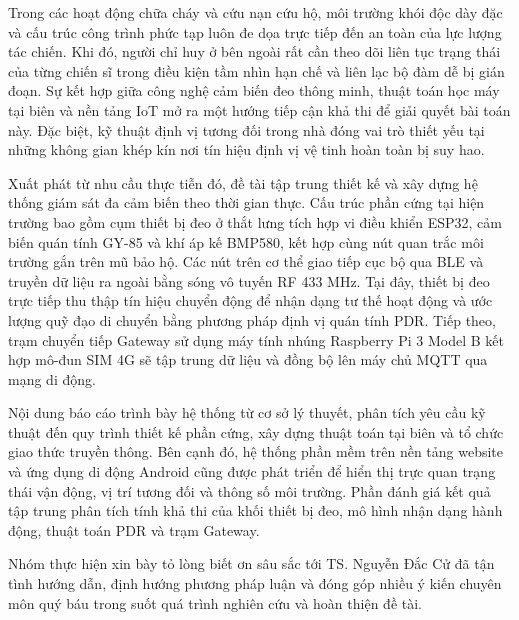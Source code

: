 Trong các hoạt động chữa cháy và cứu nạn cứu hộ, môi trường khói độc dày đặc và cấu trúc công trình phức tạp luôn đe dọa trực tiếp đến an toàn của lực lượng tác chiến. Khi đó, người chỉ huy ở bên ngoài rất cần theo dõi liên tục trạng thái của từng chiến sĩ trong điều kiện tầm nhìn hạn chế và liên lạc bộ đàm dễ bị gián đoạn. Sự kết hợp giữa công nghệ cảm biến đeo thông minh, thuật toán học máy tại biên và nền tảng IoT mở ra một hướng tiếp cận khả thi để giải quyết bài toán này. Đặc biệt, kỹ thuật định vị tương đối trong nhà đóng vai trò thiết yếu tại những không gian khép kín nơi tín hiệu định vị vệ tinh hoàn toàn bị suy hao.

Xuất phát từ nhu cầu thực tiễn đó, đề tài tập trung thiết kế và xây dựng hệ thống giám sát đa cảm biến theo thời gian thực. Cấu trúc phần cứng tại hiện trường bao gồm cụm thiết bị đeo ở thắt lưng tích hợp vi điều khiển ESP32, cảm biến quán tính GY-85 và khí áp kế BMP580, kết hợp cùng nút quan trắc môi trường gắn trên mũ bảo hộ. Các nút trên cơ thể giao tiếp cục bộ qua BLE và truyền dữ liệu ra ngoài bằng sóng vô tuyến RF 433 MHz. Tại đây, thiết bị đeo trực tiếp thu thập tín hiệu chuyển động để nhận dạng tư thế hoạt động và ước lượng quỹ đạo di chuyển bằng phương pháp định vị quán tính PDR. Tiếp theo, trạm chuyển tiếp Gateway sử dụng máy tính nhúng Raspberry Pi 3 Model B kết hợp mô-đun SIM 4G sẽ tập trung dữ liệu và đồng bộ lên máy chủ MQTT qua mạng di động.

Nội dung báo cáo trình bày hệ thống từ cơ sở lý thuyết, phân tích yêu cầu kỹ thuật đến quy trình thiết kế phần cứng, xây dựng thuật toán tại biên và tổ chức giao thức truyền thông. Bên cạnh đó, hệ thống phần mềm trên nền tảng website và ứng dụng di động Android cũng được phát triển để hiển thị trực quan trạng thái vận động, vị trí tương đối và thông số môi trường. Phần đánh giá kết quả tập trung phân tích tính khả thi của khối thiết bị đeo, mô hình nhận dạng hành động, thuật toán PDR và trạm Gateway.

Nhóm thực hiện xin bày tỏ lòng biết ơn sâu sắc tới TS. Nguyễn Đắc Cử đã tận tình hướng dẫn, định hướng phương pháp luận và đóng góp nhiều ý kiến chuyên môn quý báu trong suốt quá trình nghiên cứu và hoàn thiện đề tài.